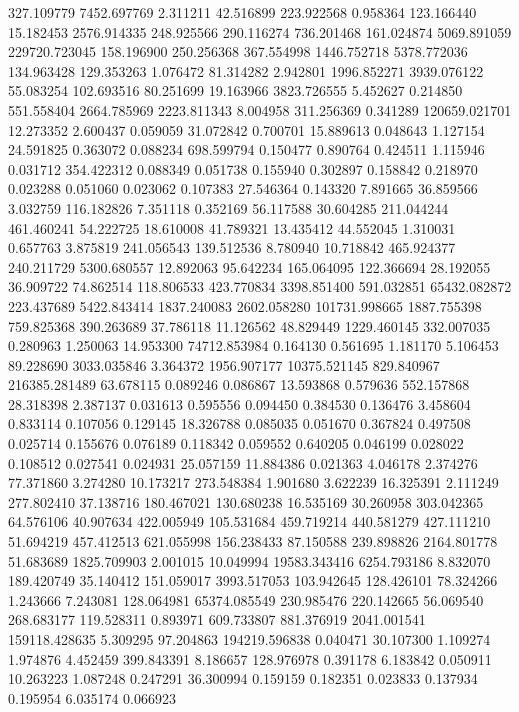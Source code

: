 327.109779
7452.697769
2.311211
42.516899
223.922568
0.958364
123.166440
15.182453
2576.914335
248.925566
290.116274
736.201468
161.024874
5069.891059
229720.723045
158.196900
250.256368
367.554998
1446.752718
5378.772036
134.963428
129.353263
1.076472
81.314282
2.942801
1996.852271
3939.076122
55.083254
102.693516
80.251699
19.163966
3823.726555
5.452627
0.214850
551.558404
2664.785969
2223.811343
8.004958
311.256369
0.341289
120659.021701
12.273352
2.600437
0.059059
31.072842
0.700701
15.889613
0.048643
1.127154
24.591825
0.363072
0.088234
698.599794
0.150477
0.890764
0.424511
1.115946
0.031712
354.422312
0.088349
0.051738
0.155940
0.302897
0.158842
0.218970
0.023288
0.051060
0.023062
0.107383
27.546364
0.143320
7.891665
36.859566
3.032759
116.182826
7.351118
0.352169
56.117588
30.604285
211.044244
461.460241
54.222725
18.610008
41.789321
13.435412
44.552045
1.310031
0.657763
3.875819
241.056543
139.512536
8.780940
10.718842
465.924377
240.211729
5300.680557
12.892063
95.642234
165.064095
122.366694
28.192055
36.909722
74.862514
118.806533
423.770834
3398.851400
591.032851
65432.082872
223.437689
5422.843414
1837.240083
2602.058280
101731.998665
1887.755398
759.825368
390.263689
37.786118
11.126562
48.829449
1229.460145
332.007035
0.280963
1.250063
14.953300
74712.853984
0.164130
0.561695
1.181170
5.106453
89.228690
3033.035846
3.364372
1956.907177
10375.521145
829.840967
216385.281489
63.678115
0.089246
0.086867
13.593868
0.579636
552.157868
28.318398
2.387137
0.031613
0.595556
0.094450
0.384530
0.136476
3.458604
0.833114
0.107056
0.129145
18.326788
0.085035
0.051670
0.367824
0.497508
0.025714
0.155676
0.076189
0.118342
0.059552
0.640205
0.046199
0.028022
0.108512
0.027541
0.024931
25.057159
11.884386
0.021363
4.046178
2.374276
77.371860
3.274280
10.173217
273.548384
1.901680
3.622239
16.325391
2.111249
277.802410
37.138716
180.467021
130.680238
16.535169
30.260958
303.042365
64.576106
40.907634
422.005949
105.531684
459.719214
440.581279
427.111210
51.694219
457.412513
621.055998
156.238433
87.150588
239.898826
2164.801778
51.683689
1825.709903
2.001015
10.049994
19583.343416
6254.793186
8.832070
189.420749
35.140412
151.059017
3993.517053
103.942645
128.426101
78.324266
1.243666
7.243081
128.064981
65374.085549
230.985476
220.142665
56.069540
268.683177
119.528311
0.893971
609.733807
881.376919
2041.001541
159118.428635
5.309295
97.204863
194219.596838
0.040471
30.107300
1.109274
1.974876
4.452459
399.843391
8.186657
128.976978
0.391178
6.183842
0.050911
10.263223
1.087248
0.247291
36.300994
0.159159
0.182351
0.023833
0.137934
0.195954
6.035174
0.066923
